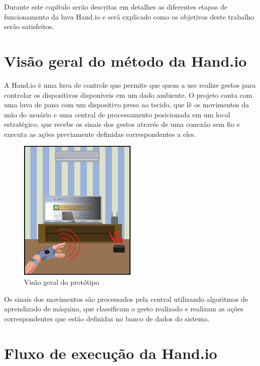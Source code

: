 Durante este capítulo serão descritas em detalhes as diferentes etapas de funcionamento da luva Hand.io e será explicado como os objetivos deste trabalho serão satisfeitos.

\section{Visão geral do método da Hand.io}

A Hand.io é uma luva de controle que permite que quem a use realize gestos para controlar os dispositivos disponíveis em um dado ambiente. O projeto conta com uma luva de pano com um dispositivo preso ao tecido, que lê os movimentos da mão do usuário e uma central de processamento posicionada em um local estratégico, que recebe os sinais dos gestos através de uma conexão sem fio e executa as ações previamente definidas correspondentes a eles.

\begin{figure}[ht]
    \centering
    \includegraphics[width=0.5\textwidth, keepaspectratio]{resources/bigpicture.jpeg}
    \caption{Visão geral do protótipo}
    \label{fig:bigpicture}
\end{figure}

Os sinais dos movimentos são processados pela central utilizando algoritmos de aprendizado de máquina, que classificam o gesto realizado e realizam as ações correspondentes que estão definidas no banco de dados do sistema.


\section{Fluxo de execução da Hand.io}

